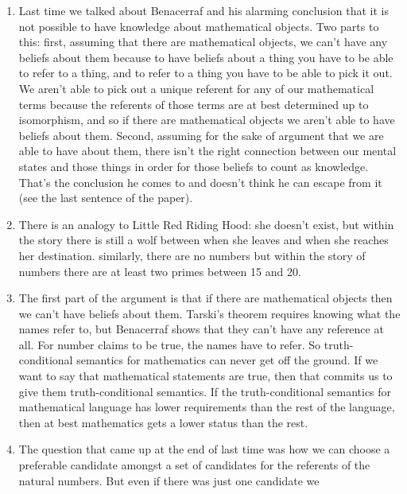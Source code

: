 \documentclass[12pt]{article}
\theoremstyle{definition}
\begin{document}
\begin{enumerate}
    \itemsep0em 
    \item 
        Last time we talked about Benacerraf and his alarming conclusion that
        it is not possible to have knowledge about mathematical objects. Two
        parts to this: first, assuming that there are mathematical objects, we
        can't have any beliefs about them because to have beliefs about a thing
        you have to be able to refer to a thing, and to refer to a thing you
        have to be able to pick it out. We aren't able to pick out a unique
        referent for any of our mathematical terms because the referents of
        those terms are at best determined up to isomorphism, and so if there
        are mathematical objects we aren't able to have beliefs about them.
        Second, assuming for the sake of argument that we are able to have
        about them, there isn't the right connection between our mental states
        and those things in order for those beliefs to count as knowledge.
        That's the conclusion he comes to and doesn't think he can escape from
        it (see the last sentence of the paper). 
    \item
        There is an analogy to Little Red Riding Hood: she doesn't exist, but
        within the story there is still a wolf between when she leaves and when
        she reaches her destination. similarly, there are no numbers but within
        the story of numbers there are at least two primes between 15 and 20.
    \item
        The first part of the argument is that if there are mathematical
        objects then we can't have beliefs about them. Tarski's theorem
        requires knowing what the names refer to, but Benacerraf shows that
        they can't have any reference at all. For number claims to be true,
        the names have to refer. So truth-conditional semantics for mathematics
        can never get off the ground. If we want to say that mathematical
        statements are true, then that commits us to give them
        truth-conditional semantics. If the truth-conditional semantics for
        mathematical language has lower requirements than the rest of the
        language, then at best mathematics gets a lower status than the rest. 
    \item
        The question that came up at the end of last time was how we can choose
        a preferable candidate amongst a set of candidates for the referents
        of the natural numbers. But even if there was just one candidate we

\end{enumerate}
\end{document}

